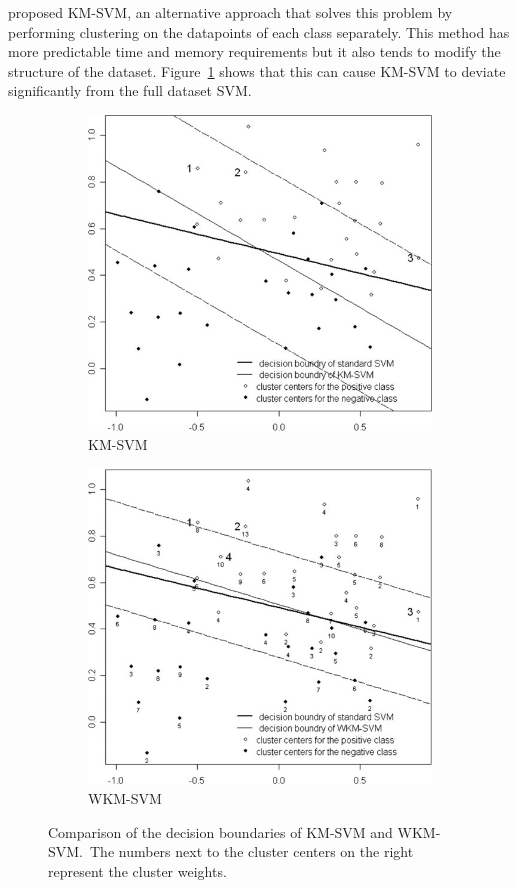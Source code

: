 \citet{Lee2007} proposed KM-SVM, an alternative approach that solves this problem by performing clustering on the datapoints of each class separately.
This method has more predictable time and memory requirements but it also tends to modify the structure of the dataset.
Figure~\ref{fig:wkmsvm:compare:km} shows that this can cause KM-SVM to deviate significantly from the full dataset SVM.\
\begin{figure}
	\begin{subfigure}{0.5\textwidth}
		\centering
		\includegraphics[width=0.85\linewidth]{gfx/wkmsvm/km.png}
		\caption{KM-SVM}\label{fig:wkmsvm:compare:km}
	\end{subfigure}
	\begin{subfigure}{0.5\textwidth}
		\centering
		\includegraphics[width=0.85\linewidth]{gfx/wkmsvm/wkm.png}
		\caption{WKM-SVM}\label{fig:wkmsvm:compare:wkm}
	\end{subfigure}
	\caption{
		Comparison of the decision boundaries of KM-SVM and WKM-SVM.\
		The numbers next to the cluster centers on the right represent the cluster weights.
		\source{Bang2014}
	}\label{fig:wkmsvm:compare}
\end{figure}

